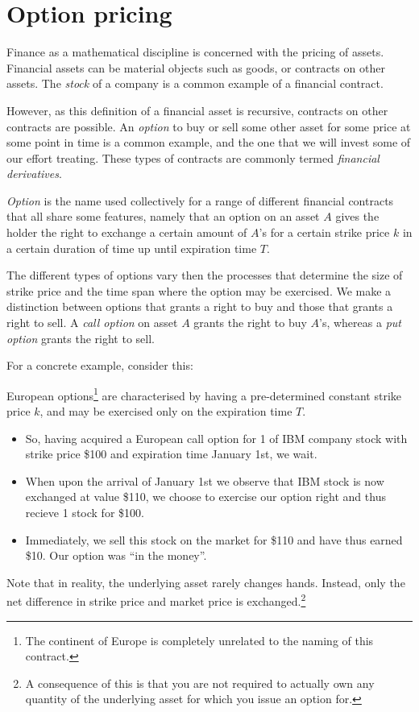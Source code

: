 \section{Option pricing}

Finance as a mathematical discipline is concerned with the pricing of assets.
Financial assets can be material objects such as goods, or contracts on other
assets. The \emph{stock} of a company is a common example of a financial contract.

However, as this definition of a financial asset is recursive, contracts on
other contracts are possible. An \emph{option} to buy or sell some other asset
for some price at some point in time is a common example, and the one that we
will invest some of our effort treating. These types of contracts are commonly
termed \emph{financial derivatives}.

\emph{Option} is the name used collectively for a range of different financial
contracts that all share some features, namely that an option on an asset $A$
gives the holder the right to exchange a certain amount of $A$'s for a certain
strike price $k$ in a certain duration of time up until expiration time $T$.

The different types of options vary then the processes that determine the
size of strike price and the time span where the option may be exercised.
We make a distinction between options that grants a right to buy and those that
grants a right to sell. A \emph{call option} on asset $A$ grants the right to
buy $A$'s, whereas a \emph{put option} grants the right to sell.

For a concrete example, consider this:
\begin{example}
  European options\footnote{The continent of Europe is completely unrelated to
  the naming of this contract.} are characterised by having a pre-determined
  constant strike price $k$, and may be exercised only on the expiration time
  $T$.

  \begin{itemize}
    \item So, having acquired a European call option for 1 of IBM company stock
      with strike price \$100 and expiration time January 1st, we wait.

    \item When upon the arrival of January 1st we observe that IBM stock is now
      exchanged at value \$110, we choose to exercise our option right and thus
      recieve 1 stock for \$100.

    \item Immediately, we sell this stock on the market for \$110 and have thus
      earned \$10. Our option was ``in the money''.
  \end{itemize}

  Note that in reality, the underlying asset rarely changes hands. Instead,
  only the net difference in strike price and market price is
  exchanged.\footnote{A consequence of this is that you are not required to
  actually own any quantity of the underlying asset for which you issue an
  option for.}
\end{example}

